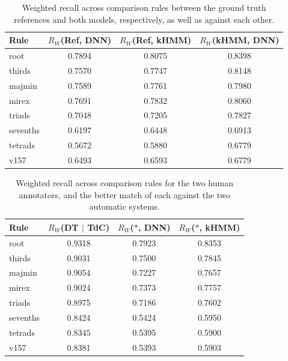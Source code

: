 \documentclass{article}
\begin{document}
\begin{table}[!t]
\scriptsize
\centering
\begin{tabular}{l||cc|c}
Rule      & $R_W$(Ref, DNN) & $R_W$(Ref, kHMM) & $R_W$(kHMM, DNN) \\
\hline
root      & 0.7894      & 0.8075       & 0.8398       \\
thirds    & 0.7570      & 0.7747       & 0.8148       \\
majmin    & 0.7589      & 0.7761       & 0.7980       \\
mirex     & 0.7691      & 0.7832       & 0.8060       \\
triads    & 0.7048      & 0.7205       & 0.7827       \\
sevenths  & 0.6197      & 0.6448       & 0.6913       \\
tetrads   & 0.5672      & 0.5880       & 0.6779       \\
v157      & 0.6493      & 0.6593       & 0.6779       \\
\hline
\end{tabular}
\caption{Weighted recall across comparison rules between the ground truth references and both models, respectively, as well as against each other.}
\label{tab:test_performance}
\end{table}

\begin{table}[!t]
\scriptsize
\centering
\begin{tabular}{l||c|cc}
Rule       & $R_W$(DT $|$ TdC) & $R_W$($\ast$, DNN) & $R_W$($\ast$, kHMM) \\
\hline
root        & 0.9318 & 0.7923 & 0.8353 \\
thirds      & 0.9031 & 0.7500 & 0.7845 \\
majmin      & 0.9054 & 0.7227 & 0.7657 \\
mirex       & 0.9024 & 0.7373 & 0.7757 \\
triads      & 0.8975 & 0.7186 & 0.7602 \\
sevenths    & 0.8424 & 0.5424 & 0.5950 \\
tetrads     & 0.8345 & 0.5395 & 0.5900 \\
v157        & 0.8381 & 0.5393 & 0.5903 \\
\hline
\end{tabular}
\caption{Weighted recall across comparison rules for the two human annotators, and the better match of each against the two automatic systems.}
\label{tab:rc_performance}
\end{table}
\end{document}
